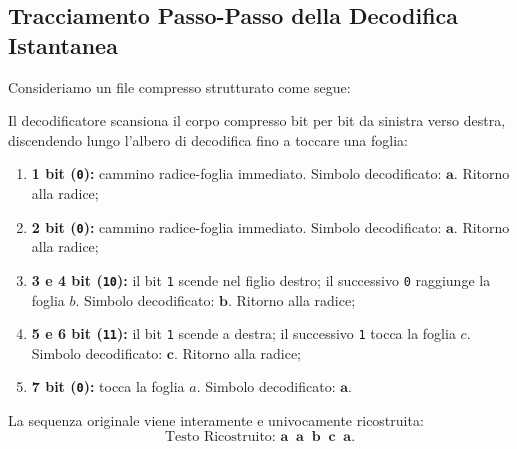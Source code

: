 \FloatBarrier
\subsection{Tracciamento Passo-Passo della Decodifica Istantanea}
\label{subsec:tracciamento-decodifica}

Consideriamo un file compresso strutturato come segue:
\begin{table}[H]
\centering
\small
{}
\caption{Struttura del messaggio compresso per la simulazione di decodifica.}
\label{tab:esempio-decodifica}
\end{table}

Il decodificatore scansiona il corpo compresso bit per bit da sinistra verso destra, discendendo lungo l'albero di decodifica fino a toccare una foglia:
\begin{enumerate}
  \item \textbf{1\textdegree{} bit (\texttt{0}):} cammino radice-foglia immediato. Simbolo decodificato: $\mathbf{a}$. Ritorno alla radice;
  \item \textbf{2\textdegree{} bit (\texttt{0}):} cammino radice-foglia immediato. Simbolo decodificato: $\mathbf{a}$. Ritorno alla radice;
  \item \textbf{3\textdegree{} e 4\textdegree{} bit (\texttt{10}):} il bit \texttt{1} scende nel figlio destro; il successivo \texttt{0} raggiunge la foglia $b$. Simbolo decodificato: $\mathbf{b}$. Ritorno alla radice;
  \item \textbf{5\textdegree{} e 6\textdegree{} bit (\texttt{11}):} il bit \texttt{1} scende a destra; il successivo \texttt{1} tocca la foglia $c$. Simbolo decodificato: $\mathbf{c}$. Ritorno alla radice;
  \item \textbf{7\textdegree{} bit (\texttt{0}):} tocca la foglia $a$. Simbolo decodificato: $\mathbf{a}$.
\end{enumerate}

La sequenza originale viene interamente e univocamente ricostruita:
\begin{equation}
  \text{Testo Ricostruito: } \mathbf{a \;\; a \;\; b \;\; c \;\; a}.
\end{equation}

